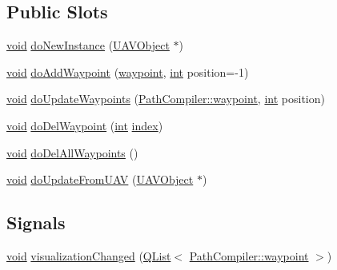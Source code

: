 \subsection*{Public Slots}
\begin{DoxyCompactItemize}
\item 
\hyperlink{group___u_a_v_objects_plugin_ga444cf2ff3f0ecbe028adce838d373f5c}{void} \hyperlink{group___o_p_map_plugin_ga1089b3cd3bacf871b8db6f14a1305819}{do\-New\-Instance} (\hyperlink{class_u_a_v_object}{U\-A\-V\-Object} $\ast$)
\item 
\hyperlink{group___u_a_v_objects_plugin_ga444cf2ff3f0ecbe028adce838d373f5c}{void} \hyperlink{group___o_p_map_plugin_gac62083613851ca96a2d14632d9553171}{do\-Add\-Waypoint} (\hyperlink{class_path_compiler_1_1waypoint}{waypoint}, \hyperlink{ioapi_8h_a787fa3cf048117ba7123753c1e74fcd6}{int} position=-\/1)
\item 
\hyperlink{group___u_a_v_objects_plugin_ga444cf2ff3f0ecbe028adce838d373f5c}{void} \hyperlink{group___o_p_map_plugin_gaadeb33c165349ef42df9dffe0d9d7b57}{do\-Update\-Waypoints} (\hyperlink{class_path_compiler_1_1waypoint}{Path\-Compiler\-::waypoint}, \hyperlink{ioapi_8h_a787fa3cf048117ba7123753c1e74fcd6}{int} position)
\item 
\hyperlink{group___u_a_v_objects_plugin_ga444cf2ff3f0ecbe028adce838d373f5c}{void} \hyperlink{group___o_p_map_plugin_ga2e7d1eed3bd9981e4f1c7d4bfeeeeba4}{do\-Del\-Waypoint} (\hyperlink{ioapi_8h_a787fa3cf048117ba7123753c1e74fcd6}{int} \hyperlink{glext_8h_ab47dd9958bcadea08866b42bf358e95e}{index})
\item 
\hyperlink{group___u_a_v_objects_plugin_ga444cf2ff3f0ecbe028adce838d373f5c}{void} \hyperlink{group___o_p_map_plugin_ga43eeb28430ee8c4569a8163c34198403}{do\-Del\-All\-Waypoints} ()
\item 
\hyperlink{group___u_a_v_objects_plugin_ga444cf2ff3f0ecbe028adce838d373f5c}{void} \hyperlink{group___o_p_map_plugin_ga559ab15dae5623715205528a06b9addc}{do\-Update\-From\-U\-A\-V} (\hyperlink{class_u_a_v_object}{U\-A\-V\-Object} $\ast$)
\end{DoxyCompactItemize}
\subsection*{Signals}
\begin{DoxyCompactItemize}
\item 
\hyperlink{group___u_a_v_objects_plugin_ga444cf2ff3f0ecbe028adce838d373f5c}{void} \hyperlink{group___o_p_map_plugin_ga9b1e292fa1cea559f4177ac8adb8d19d}{visualization\-Changed} (\hyperlink{class_q_list}{Q\-List}$<$ \hyperlink{class_path_compiler_1_1waypoint}{Path\-Compiler\-::waypoint} $>$)
\end{DoxyCompactItemize}
